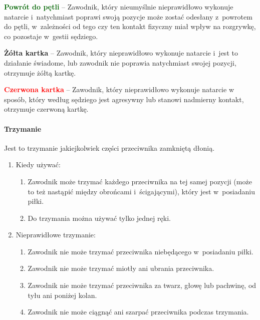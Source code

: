 \documentclass[12pt]{article}
\newcommand\redcard[1]{\bgroup\textcolor{red}{\textbf{#1}}}
\newcommand\yellowcard[1]{\bgroup\textcolor{darkyellow}{\textbf{#1}}}
\newcommand\other[1]{\bgroup\textcolor{darkgreen}{\textbf{#1}}}
\begin{document}
\other{Powrót do pętli} -- Zawodnik, który nieumyślnie nieprawidłowo
wykonuje natarcie i~natychmiast poprawi swoją pozycje może zostać
odesłany z~powrotem do pętli, w~zależności od tego czy ten kontakt
fizyczny miał wpływ na rozgrywkę, co pozostaje w~gestii sędziego.

\yellowcard{Żółta kartka} -- Zawodnik, który nieprawidłowo wykonuje natarcie i~jest to działanie świadome, lub zawodnik nie poprawia natychmiast swojej
pozycji, otrzymuje żółtą kartkę.

\redcard{Czerwona kartka} -- Zawodnik, który nieprawidłowo wykonuje natarcie
w sposób, który według sędziego jest agresywny lub stanowi nadmierny
kontakt, otrzymuje czerwoną kartkę.

\paragraph{Trzymanie}
Jest to trzymanie jakiejkolwiek części
przeciwnika zamkniętą dłonią.

\begin{enumerate}
	\item
	      Kiedy używać:

	      \begin{enumerate}
		      \item Zawodnik może trzymać każdego przeciwnika na tej samej pozycji
		            (może to też nastąpić między obrońcami i~ścigającymi), który jest w~posiadaniu piłki.
		      \item
		            Do trzymania można używać tylko jednej ręki.
	      \end{enumerate}
	\item
	      Nieprawidłowe trzymanie:

	      \begin{enumerate}
		      \item
		            Zawodnik nie może trzymać przeciwnika niebędącego w~posiadaniu
		            piłki.
		      \item
		            Zawodnik nie może trzymać miotły ani ubrania przeciwnika.
		      \item
		            Zawodnik nie może trzymać przeciwnika za twarz, głowę lub pachwinę,
		            od tyłu ani poniżej kolan.
		      \item Zawodnik nie może ciągnąć ani szarpać przeciwnika podczas
		            trzymania.
	      \end{enumerate}
\end{enumerate}
\end{document}
